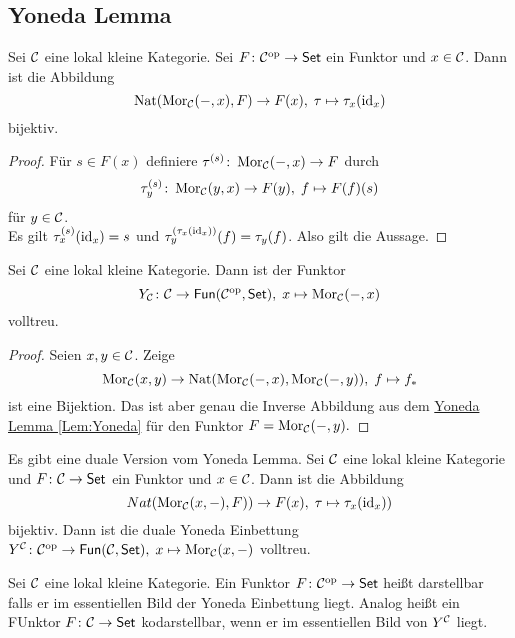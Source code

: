 \subsection{Yoneda Lemma}
\begin{Satz}\label{Lem:Yoneda}
    Sei \(\mathcal{C}\) eine lokal kleine Kategorie. Sei \(F\colon \mathcal{C}^{\mathrm{op}}\to\mathsf{Set}\) ein Funktor und \(x\in\mathcal{C}\). Dann ist die Abbildung 
    \[\operatorname{Nat}(\operatorname{Mor}_{\mathcal{C}}(-,x),F)\to F(x),\; \tau\mapsto \tau_x(\mathrm{id}_x)\] bijektiv.
\end{Satz}
\begin{proof}
    Für \(s\in F(x)\) definiere \(\tau^{(s)}\colon\operatorname{Mor}_{\mathcal{C}}(-,x)\to F\) durch \[\tau_y^{(s)}\colon \operatorname{Mor}_{\mathcal{C}}(y,x)\to F(y),\; f\mapsto F(f)(s)\] für \(y\in \mathcal{C}\).\\
    Es gilt \(\tau_x^{(s)}(\mathrm{id}_x)=s\) und \(\tau_y^{(\tau_x(\mathrm{id}_x))}(f)=\tau_y(f)\).
    Also gilt die Aussage.
\end{proof}
\begin{Kor}
    Sei \(\mathcal{C}\) eine lokal kleine Kategorie. Dann ist der Funktor \[Y_{\mathcal{C}}\colon\mathcal{C}\to\mathsf{Fun}(\mathcal{C}^{\mathrm{op}},\mathsf{Set}),\; x\mapsto \operatorname{Mor}_{\mathcal{C}}(-,x)\] volltreu.
\end{Kor}
\begin{proof}
    Seien \(x,y\in\mathcal{C}\). Zeige 
    \[\operatorname{Mor}_{\mathcal{C}}(x,y)\to\operatorname{Nat}(\operatorname{Mor}_{\mathcal{C}}(-,x),\operatorname{Mor}_{\mathcal{C}}(-,y)),\; f\mapsto f_*\] ist eine Bijektion. Das ist aber genau die Inverse Abbildung aus dem \hyperref[Lem:Yoneda]{Yoneda Lemma \ref{Lem:Yoneda}} für den Funktor \(F=\operatorname{Mor}_{\mathcal{C}}(-,y).\)
\end{proof}
\begin{Bem}
    Es gibt eine duale Version vom Yoneda Lemma. Sei \(\mathcal{C}\) eine lokal kleine Kategorie und \(F\colon\mathcal{C}\to\mathsf{Set}\) ein Funktor und \(x\in\mathcal{C}\). Dann ist die Abbildung 
    \[Nat(\operatorname{Mor}_{\mathcal{C}}(x,-),F))\to F(x),\; \tau\mapsto \tau_x(\mathrm{id}_x))\] bijektiv. Dann ist die duale Yoneda Einbettung \(Y^{\mathcal{C}}\colon\mathcal{C}^{\mathrm{op}}\to\mathsf{Fun}(\mathcal{C},\mathsf{Set}),\; x\mapsto \operatorname{Mor}_{\mathcal{C}}(x,-)\) volltreu.
\end{Bem}
\begin{Def}
    Sei \(\mathcal{C}\) eine lokal kleine Kategorie. Ein Funktor \(F\colon\mathcal{C}^{\mathrm{op}}\to \mathsf{Set}\) heißt darstellbar falls er im essentiellen Bild der Yoneda Einbettung liegt.  Analog heißt ein FUnktor \(F\colon\mathcal{C}\to\mathsf{Set}\)  kodarstellbar, wenn er im essentiellen Bild von \(Y^{\mathcal{C}}\) liegt.
\end{Def}

